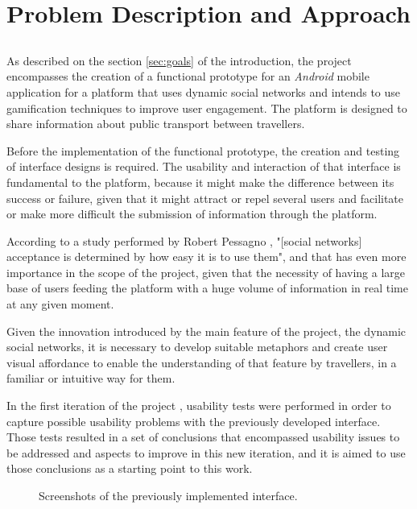 \chapter{Problem Description and Approach}\label{chap:chap3}

\section*{}

As described on the section \ref{sec:goals} of the introduction, the project encompasses the creation of a functional prototype for an \emph{Android} mobile application for a platform that uses dynamic social networks and intends to use gamification techniques to improve user engagement. The platform is designed to share information about public transport between travellers.

Before the implementation of the functional prototype, the creation and testing of interface designs is required. 
The usability and interaction of that interface is fundamental to the platform, because it might make the difference between its success or failure, given that it might attract or repel several users and facilitate or make more difficult the submission of information through the platform.

According to a study performed by Robert Pessagno \cite{kn:Pes10}, "[social networks] acceptance is determined by how easy it is to use them", and that has even more importance in the scope of the project, given that the necessity of having a large base of users feeding the platform with a huge volume of information in real time at any given moment.

Given the innovation introduced by the main feature of the project, the dynamic social networks, it is necessary to develop suitable metaphors and create user visual affordance to enable the understanding of that feature by travellers, in a familiar or intuitive way for them.

In the first iteration of the project \cite{kn:eSG12}, usability tests were performed in order to capture possible usability problems with the previously developed interface. 
Those tests resulted in a set of conclusions that encompassed  usability issues to be addressed and aspects to improve in this new iteration, and it is aimed to use those conclusions as a starting point to this work. 

\begin{figure}[h]
\begin{center}
\leavevmode
{} \hspace{1em}%
\caption{Screenshots of the previously implemented interface.}

\label{fig:current}
\end{center}
\end{figure}

